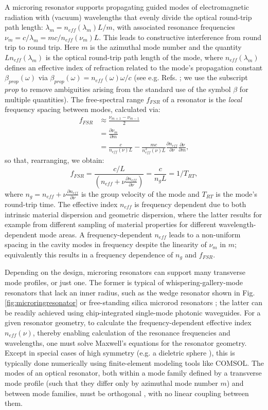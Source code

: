 A microring resonator supports propagating guided modes of electromagnetic radiation with (vacuum) wavelengths that evenly divide the optical round-trip path length: $\lambda_m=n_{eff}(\lambda_m)L/m$, with associated resonance frequencies $\nu_m=c/\lambda_m=mc/n_{eff}(\nu_m)L$. This leads to constructive interference from round trip to round trip. Here $m$ is the azimuthal mode number and the quantity $Ln_{eff}(\lambda_m)$ is the optical round-trip path length of the mode, where $n_{eff}(\lambda_m)$ defines an effective index of refraction related to the mode's propagation constant $\beta_{prop}(\omega)$ via $\beta_{prop}(\omega)=n_{eff}(\omega)\omega/c$ (see e.g. Refs. \cite{Agrawal2007,Calvo2007}; we use the subscript $prop$ to remove ambiguities arising from the standard use of the symbol $\beta$ for multiple quantities). The free-spectral range $f_{FSR}$ of a resonator is the \textit{local} frequency spacing between modes, calculated via:
\begin{align}
	f_{FSR}&\approx \frac{\nu_{m+1}-\nu_{m-1}}{2}\\
	&=\frac{\partial\nu_m}{\partial m}\\
	&=\frac{c}{n_{eff}(\nu)L}-\frac{mc}{n_{eff}^2(\nu)L}\frac{\partial n_{eff}}{\partial \nu}\frac{\partial \nu}{\partial m},
	\end{align}
	so that, rearranging, we obtain:
	\begin{equation}
	f_{FSR}=\frac{c/L}{\left(n_{eff}+\nu\frac{\partial n_{eff}}{\partial \nu}\right)}=\frac{c}{n_g L}=1/T_{RT},
\end{equation}
	where $n_g=n_{eff}+\nu\frac{\partial n_{eff}}{\partial \nu}$ is the group velocity of the mode and $T_{RT}$ is the mode's round-trip time. The effective index $n_{eff}$ is frequency dependent due to both intrinsic material dispersion and geometric dispersion, where the latter results for example from different sampling of material properties for different wavelength-dependent mode areas. A frequency-dependent $n_{eff}$ leads to a non-uniform spacing in the cavity modes in frequency despite the linearity of $\nu_m$ in $m$; equivalently this results in a frequency dependence of $n_g$ and $f_{FSR}$.
	
Depending on the design, microring resonators can support many transverse mode profiles, or just one. The former is typical of whispering-gallery-mode resonators that lack an inner radius, such as the wedge resonator shown in Fig. \ref{fig:microringresonator} or free-standing silica microrod resonators \cite{DelHaye2013}; the latter can be readily achieved using chip-integrated single-mode photonic waveguides. For a given resonator geometry, to calculate the frequency-dependent effective index $n_{eff}(\nu)$, thereby enabling calculation of the resonance frequencies and wavelengths, one must solve Maxwell's equations for the resonator geometry. Except in special cases of high symmetry (e.g. a dieletric sphere \cite{Oraevsky2002}), this is typically done numerically using finite-element modeling tools like COMSOL. The modes of an optical resonator, both within a mode family defined by a transverse mode profile (such that they differ only by azimuthal mode number $m$) and between mode families, must be orthogonal \cite{Haus1984}, with no linear coupling between them.

